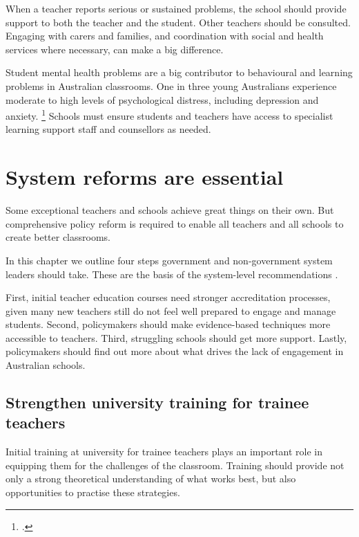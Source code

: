 \documentclass{grattan}
\begin{document}
When a teacher reports serious or sustained problems, the school should provide support to both the teacher and the student. Other teachers should be consulted. Engaging with carers and families, and coordination with social and health services where necessary, can make a big difference.

Student mental health problems are a big contributor to behavioural and learning problems in Australian classrooms. One in three young Australians experience moderate to high levels of psychological distress, including depression and anxiety.%
    \footcite{Waters2011ReviewSchoolBased}
Schools must ensure students and teachers have access to specialist learning support staff and counsellors as needed.

\chapter{System reforms are essential}\label{chap:policy-reforms-essential}

Some exceptional teachers and schools achieve great things on their own. But comprehensive policy reform is required to enable all teachers and all schools to create better classrooms.

In this chapter we outline four steps government and non-government system leaders should take. These are the basis of the system-level recommendations .

First, initial teacher education courses need stronger accreditation processes, given many new teachers still do not feel well prepared to engage and manage students.
Second, policymakers should make evidence-based techniques more accessible to teachers.
Third, struggling schools should get more support. %
Lastly, policymakers should find out more about what drives the lack of engagement in Australian schools. %

\section{Strengthen university training for trainee teachers}\label{sec:raise-initial-teacher-education}

Initial training at university for trainee teachers plays an important role in equipping them for the challenges of the classroom. Training should provide not only a strong theoretical understanding of what works best, but also opportunities to practise these strategies.
\end{document}
